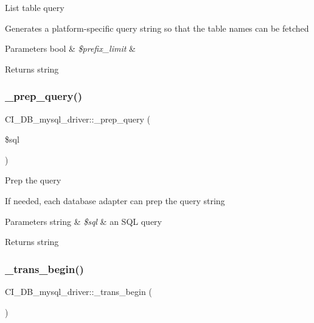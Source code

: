 List table query

Generates a platform-\/specific query string so that the table names can be fetched


\begin{DoxyParams}[1]{Parameters}
bool & {\em \$prefix\+\_\+limit} & \\
\hline
\end{DoxyParams}
\begin{DoxyReturn}{Returns}
string 
\end{DoxyReturn}
\mbox{\label{class_c_i___d_b__mysql__driver_a237e54c34a0a94287a04f23e1fc6e0ed}} 
\subsubsection{\texorpdfstring{\+\_\+prep\+\_\+query()}{\_prep\_query()}}
{\footnotesize\ttfamily C\+I\+\_\+\+D\+B\+\_\+mysql\+\_\+driver\+::\+\_\+prep\+\_\+query (\begin{DoxyParamCaption}\item[{}]{\$sql }\end{DoxyParamCaption})\hspace{0.3cm}{\ttfamily [protected]}}

Prep the query

If needed, each database adapter can prep the query string


\begin{DoxyParams}[1]{Parameters}
string & {\em \$sql} & an S\+QL query \\
\hline
\end{DoxyParams}
\begin{DoxyReturn}{Returns}
string 
\end{DoxyReturn}
\mbox{\label{class_c_i___d_b__mysql__driver_a3905da822b6ffc78ce6aaabb52997c4e}} 
\subsubsection{\texorpdfstring{\+\_\+trans\+\_\+begin()}{\_trans\_begin()}}
{\footnotesize\ttfamily C\+I\+\_\+\+D\+B\+\_\+mysql\+\_\+driver\+::\+\_\+trans\+\_\+begin (\begin{DoxyParamCaption}{ }\end{DoxyParamCaption})\hspace{0.3cm}{\ttfamily [protected]}}

